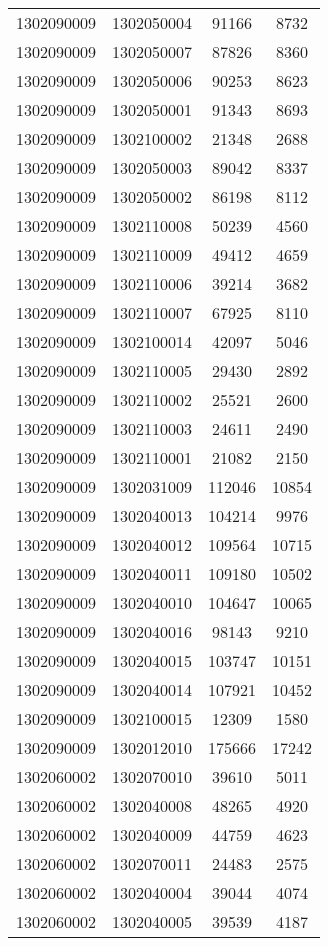 \begin{longtable}{llcc}
1302090009 & 1302050004 & 91166 & 8732\\
1302090009 & 1302050007 & 87826 & 8360\\
1302090009 & 1302050006 & 90253 & 8623\\
1302090009 & 1302050001 & 91343 & 8693\\
1302090009 & 1302100002 & 21348 & 2688\\
1302090009 & 1302050003 & 89042 & 8337\\
1302090009 & 1302050002 & 86198 & 8112\\
1302090009 & 1302110008 & 50239 & 4560\\
1302090009 & 1302110009 & 49412 & 4659\\
1302090009 & 1302110006 & 39214 & 3682\\
1302090009 & 1302110007 & 67925 & 8110\\
1302090009 & 1302100014 & 42097 & 5046\\
1302090009 & 1302110005 & 29430 & 2892\\
1302090009 & 1302110002 & 25521 & 2600\\
1302090009 & 1302110003 & 24611 & 2490\\
1302090009 & 1302110001 & 21082 & 2150\\
1302090009 & 1302031009 & 112046 & 10854\\
1302090009 & 1302040013 & 104214 & 9976\\
1302090009 & 1302040012 & 109564 & 10715\\
1302090009 & 1302040011 & 109180 & 10502\\
1302090009 & 1302040010 & 104647 & 10065\\
1302090009 & 1302040016 & 98143 & 9210\\
1302090009 & 1302040015 & 103747 & 10151\\
1302090009 & 1302040014 & 107921 & 10452\\
1302090009 & 1302100015 & 12309 & 1580\\
1302090009 & 1302012010 & 175666 & 17242\\
1302060002 & 1302070010 & 39610 & 5011\\
1302060002 & 1302040008 & 48265 & 4920\\
1302060002 & 1302040009 & 44759 & 4623\\
1302060002 & 1302070011 & 24483 & 2575\\
1302060002 & 1302040004 & 39044 & 4074\\
1302060002 & 1302040005 & 39539 & 4187\\

\end{longtable}
